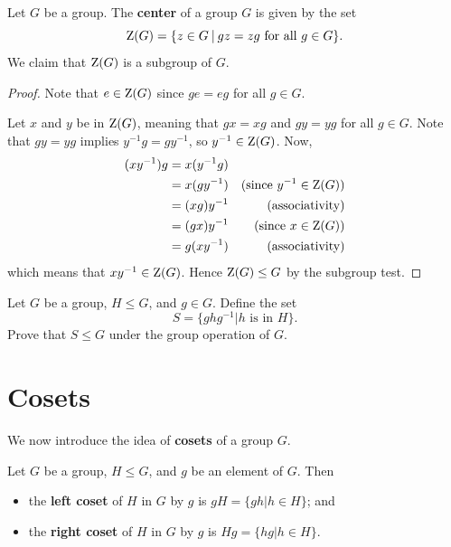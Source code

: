 \begin{example}\label{example-center-of-group}
    Let $G$ be a group. The \textbf{center} of a group $G$ is given by the set
    \[
        \Z{G} = \{z \in G \vert gz = zg \text{ for all } g \in G\}.
    \]
    We claim that $\mathrm{Z}(G)$ is a subgroup of $G$.

    \begin{proof}
	    Note that $e \in \mathrm{Z}(G)$ since $ge = eg$ for all $g \in G$.

	    Let $x$ and $y$ be in $\mathrm{Z}(G)$, meaning that $gx = xg$ and $gy = yg$ for all $g \in G$. Note that $gy = yg$ implies $y^{-1}g = gy^{-1}$, so $y^{-1} \in \mathrm{Z}(G)$. Now,
	    \begin{align*}
	        (xy^{-1})g &= x(y^{-1}g)\\
	        &= x(gy^{-1}) & (\text{since } y^{-1} \in \mathrm{Z}(G))\\
	        &= (xg)y^{-1} & (\text{associativity})\\
	        &= (gx)y^{-1} & (\text{since } x \in \mathrm{Z}(G))\\
	        &= g(xy^{-1}) & (\text{associativity})
	    \end{align*}
	    which means that $xy^{-1} \in \mathrm{Z}(G)$. Hence $\mathrm{Z}(G) \leq G$ by the subgroup test.
    \end{proof}
\end{example}

\begin{exercise}\label{exercise-conjugate-subgroup}
    Let $G$ be a group, $H \leq G$, and $g \in G$. Define the set
    \[
        S = \{ghg^{-1} \vert h \text{ is in } H\}.
    \]
    Prove that $S \leq G$ under the group operation of $G$.
\end{exercise}

\newpage

\section{Cosets}
We now introduce the idea of \textbf{cosets} of a group $G$.
\begin{definition}
    Let $G$ be a group, $H \leq G$, and $g$ be an element of $G$. Then
    \begin{itemize}
        \item the \textbf{left coset} of $H$ in $G$ by $g$ is $gH = \{gh \vert h \in H\}$; and
        \item the \textbf{right coset} of $H$ in $G$ by $g$ is $Hg = \{hg \vert h \in H\}$.
    \end{itemize}
\end{definition}

